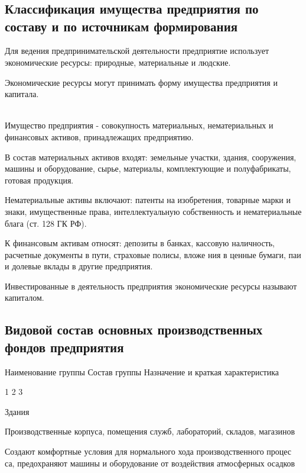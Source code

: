 \chapter{}

\section{Классификация имущества предприятия по составу и по источникам
формирования}

Для ведения предпринимательской деятельности предприятие использует
экономические ресурсы: природные, материальные и людские.

Экономические ресурсы могут принимать форму имущества предприятия и капитала.

\begin{definition}
    ~\\
Имущество предприятия - совокупность материальных, нематериальных и финансовых
активов, принадлежащих предприятию.
\end{definition}

В состав материальных активов входят: земельные участки, здания, сооружения,
машины и оборудование, сырье, материалы, комплектующие и полуфабрикаты, готовая
продукция.

Нематериальные активы включают: патенты на изобретения, товарные марки и знаки,
имущественные права, интеллектуальную собственность и нематериальные блага (ст.
128 ГК РФ).

К финансовым активам относят: депозиты в банках, кассовую наличность, расчетные
документы в пути, страховые полисы, вложе ния в ценные бумаги, паи и долевые
вклады в другие предприятия.

Инвестированные в деятельность предприятия экономические ресурсы называют
капиталом.

\section{Видовой состав основных производственных фондов предприятия}

Наименование группы
Состав группы
Назначение и краткая характеристика

1
2
3

Здания

Производственные корпуса, помещения служб, лабораторий, складов, магазинов

Создают комфортные условия для нормального хода производственного процес са,
предохраняют машины и оборудование от воздействия атмосферных осадков

